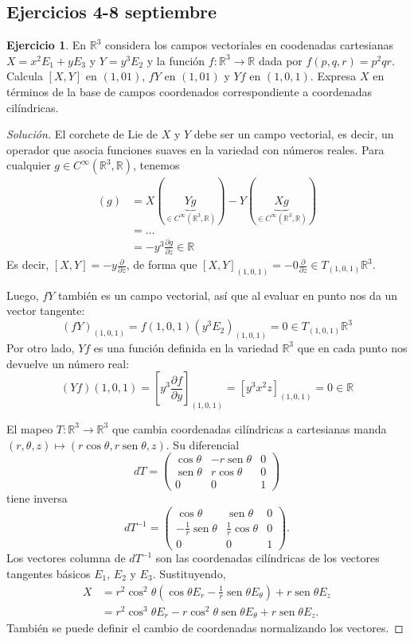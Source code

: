 \documentclass[spanish]{book}
\theoremstyle{definition}
\newtheorem{ejer}{Ejercicio}
\newcommand{\R}{\mathbb{R}}
\newcommand{\Cinf}{C^\infty}
\DeclareMathOperator{\sen}{sen}
\begin{document}
	\subsection{Ejercicios 4-8 septiembre}
	\begin{ejer}
		En $\R^3$ considera los campos vectoriales en coodenadas cartesianas $X=x^2E_1+yE_3$ y $Y=y^3E_2$ y la función $f:\R^3\to\R$ dada por $f(p,q,r)=p^2qr$. Calcula $[X,Y]$ en $(1,01)$, $fY$ en $(1,01)$ y $Yf$ en $(1,0,1)$. Expresa $X$ en términos de la base de campos coordenados correspondiente a coordenadas cilíndricas.
	\end{ejer}
	\begin{proof}[Solución]
		
		El corchete de Lie de $X$ y $Y$ debe ser un campo vectorial, es decir, un operador que asocia funciones suaves en la variedad con números reales. Para cualquier $g\in\Cinf(\R^3,\R)$, tenemos
		\begin{align*}
			[X,Y](g)&=X(\underbrace{Yg}_{\in\Cinf(\R^3,\R)})-Y(\underbrace{Xg}_{\in\Cinf(\R^3,\R)})\\
			&=\ldots\\
			&=-y^3\frac{\partial g}{\partial z}\in\R
		\end{align*}
		Es decir, $[X,Y]=-y\frac{\partial}{\partial z}$, de forma que $[X,Y]_{(1,0,1)}=-0\frac{\partial}{\partial z}\in T_{(1,0,1)}\R^3$.
		
		Luego, $fY$ también es un campo vectorial, así que al evaluar en punto nos da un vector tangente:
		\[(fY)_{(1,0,1)}=f(1,0,1)(y^3E_2)_{(1,0,1)}=0\in T_{(1,0,1)}\R^3\]
		Por otro lado, $Yf$ es una función definida en la variedad $\R^3$ que en cada punto nos devuelve un número real:
		\[(Yf)(1,0,1)=\left[y^3\frac{\partial f}{\partial y}\right]_{(1,0,1)}=[y^3x^2z]_{(1,0,1)}=0\in\R\]
		
		El mapeo $T:\R^3\to\R^3$ que cambia coordenadas cilíndricas a cartesianas manda $(r,\theta,z)\mapsto(r\cos\theta,r\sen\theta,z)$. Su diferencial
		\[dT=\begin{pmatrix}
			\cos\theta&-r\sen\theta&0\\
			\sen\theta&r\cos\theta&0\\
			0&0&1
		\end{pmatrix}\]
		tiene inversa
		\[dT^{-1}=\begin{pmatrix}
			\cos\theta&\sen\theta&0\\
			-\frac{1}{r}\sen\theta&\frac{1}{r}\cos\theta&0\\
			0&0&1
		\end{pmatrix}.\]
		Los vectores columna de $dT^{-1}$ son las coordenadas cilíndricas de los vectores tangentes básicos $E_1$, $E_2$ y $E_3$. Sustituyendo,
		\begin{align*}
			X&=r^2\cos^2\theta(\cos\theta E_r-\frac{1}{r}\sen\theta E_\theta)+r\sen\theta E_z\\
			&=r^2\cos^3\theta E_r-r\cos^2\theta\sen\theta E_\theta+r\sen\theta E_z.
		\end{align*}
		También se puede definir el cambio de coordenadas normalizando los vectores.
	\end{proof}
\end{document}
